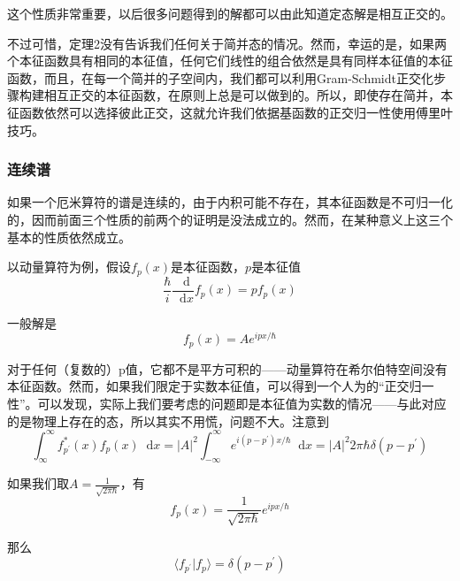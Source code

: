 \documentclass[UTF8]{ctexart}
\begin{document}
\noindent 这个性质非常重要，以后很多问题得到的解都可以由此知道定态解是相互正交的。

    不过可惜，定理2没有告诉我们任何关于简并态的情况。然而，幸运的是，如果两个本征函数具有相同的本征值，任何它们线性的组合依然是具有同样本征值的本征函数，而且，在每一个简并的子空间内，我们都可以利用Gram-Schmidt正交化步骤构建相互正交的本征函数，在原则上总是可以做到的。所以，即使存在简并，本征函数依然可以选择彼此正交，这就允许我们依据基函数的正交归一性使用傅里叶技巧。

    \subsubsection{连续谱}
    如果一个厄米算符的谱是连续的，由于内积可能不存在，其本征函数是不可归一化的，因而前面三个性质的前两个的证明是没法成立的。然而，在某种意义上这三个基本的性质依然成立。

    以动量算符为例，假设$f_p(x)$是本征函数，$p$是本征值
    \begin{equation}
        \frac{\hbar}{i} \frac{\mathop{}\!\mathrm{d} }{\mathop{}\!\mathrm{d} x} f_p(x) = pf_p(x)
    \end{equation}

\noindent 一般解是
\begin{equation}
    f_p(x) = A e^{i p x/ \hbar}
\end{equation}

\noindent 对于任何（复数的）p值，它都不是平方可积的——动量算符在希尔伯特空间没有本征函数。然而，如果我们限定于实数本征值，可以得到一个人为的“正交归一性”。可以发现，实际上我们要考虑的问题即是本征值为实数的情况——与此对应的是物理上存在的态，所以其实不用慌，问题不大。注意到
\begin{equation}
    \int_{\infty}^{\infty} f_{p^{\prime}}^{*}(x) f_{p}(x) \mathop{}\!\mathrm{d}  x=|A|^{2} \int_{-\infty}^{\infty} e^{i\left(p-p^{\prime}\right) x / \hbar} \mathop{}\!\mathrm{d}  x=|A|^{2} 2 \pi \hbar \delta\left(p-p^{\prime}\right)
    \end{equation}

    如果我们取$A = \frac{1}{\sqrt{2 \pi \hbar}}$，有 
    \begin{equation}
        f_p(x) = \frac{1}{\sqrt{2 \pi \hbar}} e^{i p x / \hbar}
    \end{equation}

\noindent 那么
\begin{equation}
    \langle f_{p^{\prime}}| f_p \rangle = \delta (p - p^{\prime})
\end{equation}
\end{document}
